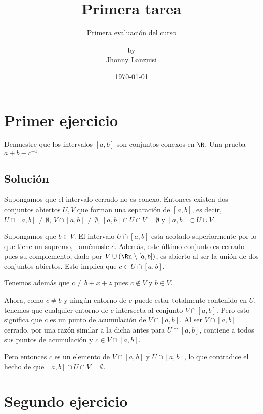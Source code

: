 \documentclass{scrartcl}
\begin{document}
%
\title{Primera tarea}
\subtitle{Primera evaluación del curso}
\subject{Análisis III}
\titlehead{Universidad Simón Bolívar\hfill Caracas, Venezuela}
\author{by \\ Jhonny Lanzuisi}
\date{\today}
\maketitle

\section{Primer ejercicio}

Demuestre que los intervalos \([a,b]\) son conjuntos conexos 
en \(\R\). Una prueba \(a + b - c^{-1}\)

\subsection{Solución}

Supongamos que el intervalo cerrado no es conexo.
Entonces existen dos conjuntos abiertos \(U,V\) que forman
una separación de \([a,b]\), es decir,
\(U\cap[a,b]\neq\emptyset\), \(V\cap[a,b]\neq\emptyset\),
\([a,b]\cap U\cap V = \emptyset\) y \([a,b]\subset U\cup V\).

Supongamos que \(b\in V\).
El intervalo \(U\cap[a,b]\) esta acotado superiormente
por lo que tiene un supremo, llamémosle \(c\).
Además, este último conjunto es cerrado pues
su complemento, dado por \(V\cup(\Rn\setminus[a,b])\),
es abierto al ser la unión de dos conjuntos abiertos.
Esto implica que \(c \in U\cap[a,b]\).

Tenemos además que \(c\neq b +x +z\) pues \(c\not\in V\) y
\(b\in V\).

Ahora, como \(c\neq b\) y ningún entorno de \(c\)
puede estar totalmente contenido en \(U\), tenemos
que cualquier entorno de \(c\) intersecta al conjunto \(V\cap[a,b]\).
Pero esto significa que \(c\) es un punto de acumulación
de \(V\cap[a,b]\). Al ser \(V\cap[a,b]\) cerrado, por una razón
similar a la dicha antes para \(U\cap[a,b]\), contiene a todos
sus puntos de acumulación y \(c \in V\cap[a,b]\).

Pero entonces \(c\) es un elemento de \(V\cap[a,b]\) y \(U\cap[a,b]\),
lo que contradice el hecho de que \([a,b]\cap U\cap V = \emptyset\).
\section{Segundo ejercicio}
\end{document}
